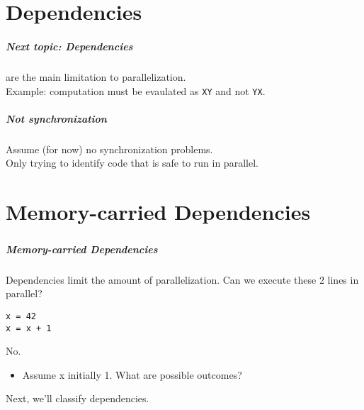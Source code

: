 \documentclass[aspectratio=43]{beamer}
\newenvironment{changemargin}[1]{%
  \begin{list}{}{%
    \setlength{\topsep}{0pt}%
    \setlength{\leftmargin}{#1}%
    \setlength{\rightmargin}{1em}
    \setlength{\listparindent}{\parindent}%
    \setlength{\itemindent}{\parindent}%
    \setlength{\parsep}{\parskip}%
  }%
  \item[]}{\end{list}}
\begin{document}
\part{Dependencies}
\frame{\partpage}

\begin{frame}
  \frametitle{Next topic: Dependencies}

  \Large
  \begin{changemargin}{2.5cm}
      are the main
      limitation to parallelization.\\[1em]
     Example: computation must be evaulated as {\tt XY} and not {\tt YX}.\\[1em]
  \end{changemargin}
\end{frame}

\begin{frame}
  \frametitle{Not synchronization}

  \Large
  \begin{changemargin}{2.5cm}
      Assume (for now) no synchronization problems.\\[1em]
      Only trying to identify code that is safe to run in
      parallel.

  \end{changemargin}
\end{frame}

\part{Memory-carried Dependencies}
\frametitle{\partpage}
\begin{frame}[fragile]
\frametitle{Memory-carried Dependencies}
\begin{changemargin}{2.5cm}
\item Dependencies limit the amount of parallelization.
\vfill
Can we execute these 2 lines in parallel?
\begin{lstlisting}
x = 42
x = x + 1  
\end{lstlisting}
\pause
\alert{No.}\\[1em]
\begin{itemize}
\item Assume x initially 1. What are possible outcomes?
\pause \newline {}\\[1em]

\end{itemize}

Next, we'll classify dependencies.

\end{changemargin}

\end{frame}
\end{document}
